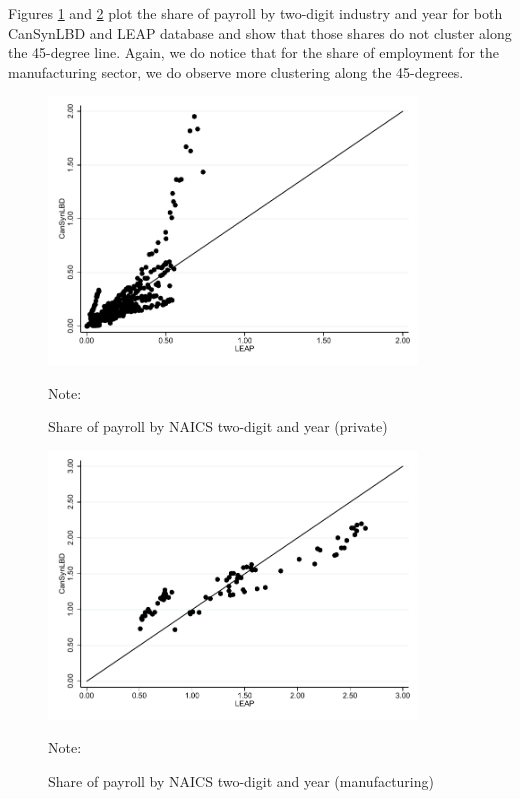\documentclass{article}
\begin{document}
Figures \ref{PayrollSharePrivate} and \ref{PayrollShareManufacturing} plot the share of payroll by two-digit industry and year for both CanSynLBD and LEAP database and show that those shares do not cluster along the 45-degree line. Again, we do notice that for the share of employment for the manufacturing sector, we do observe more clustering along the 45-degrees.
\begin{figure} [H]
\centering
\caption{Share of payroll by NAICS two-digit and year (private)} \label{PayrollSharePrivate}
\includegraphics[height=2.8in, width=.7\linewidth]{graphs/Share_of_payroll_by_NAICS_two-digit_and_year_private_bw.pdf} 
\begin{minipage}{0.85\textwidth}
{\footnotesize Note: \TableNote \par}
\end{minipage}
\end{figure}
\vspace{-15.5pt}
\begin{figure} [H]
\centering
\caption{Share of payroll by NAICS two-digit and year (manufacturing)} \label{PayrollShareManufacturing}
\includegraphics[height=2.8in, width=.7\linewidth]{graphs/Share_of_payroll_by_NAICS_two-digit_and_year_Manufacturing_bw.pdf} 
\begin{minipage}{0.85\textwidth}
{\footnotesize Note: \TableNote \par}
\end{minipage}
\end{figure}
\end{document}
